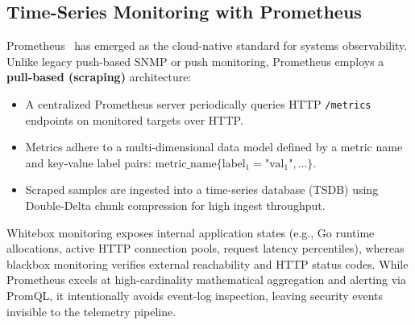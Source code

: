 \subsection{Time-Series Monitoring with Prometheus}
Prometheus~\citep{prometheus2026} has emerged as the cloud-native standard for systems observability. Unlike legacy push-based SNMP or push monitoring, Prometheus employs a \textbf{pull-based (scraping)} architecture:
\begin{itemize}
    \item A centralized Prometheus server periodically queries HTTP \texttt{/metrics} endpoints on monitored targets over HTTP.
    \item Metrics adhere to a multi-dimensional data model defined by a metric name and key-value label pairs: $\text{metric\_name}\{\text{label}_1=\text{"val}_1\text{"}, \dots\}$.
    \item Scraped samples are ingested into a time-series database (TSDB) using Double-Delta chunk compression for high ingest throughput.
\end{itemize}
Whitebox monitoring exposes internal application states (e.g., Go runtime allocations, active HTTP connection pools, request latency percentiles), whereas blackbox monitoring verifies external reachability and HTTP status codes. While Prometheus excels at high-cardinality mathematical aggregation and alerting via PromQL, it intentionally avoids event-log inspection, leaving security events invisible to the telemetry pipeline.


